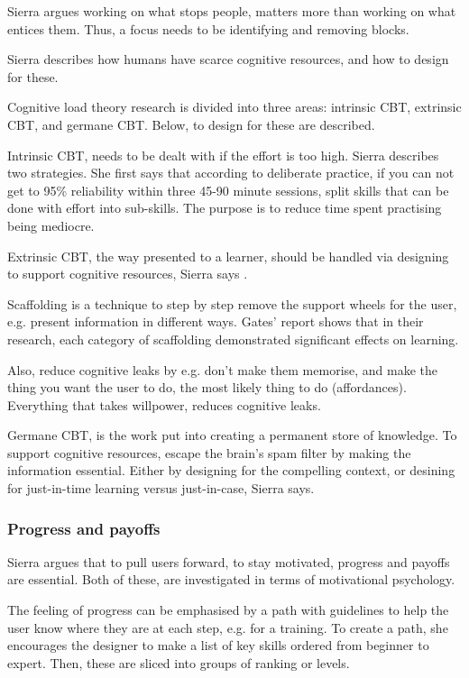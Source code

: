 Sierra argues working on what stops people, matters more than working on what entices them. Thus, a focus needs to be identifying and removing blocks.

Sierra \cite{sierra} describes how humans have scarce cognitive resources, and how to design for these.

Cognitive load theory research is divided into three areas: intrinsic CBT, extrinsic CBT, and germane CBT. Below, to design for these are described.

Intrinsic CBT, needs to be dealt with if the effort is too high. Sierra \cite{sierra}describes two strategies. She first says that according to deliberate practice, if you can not get to 95\% reliability within three 45-90 minute sessions, split skills that can be done with effort into sub-skills. The purpose is to reduce time spent practising being mediocre.

Extrinsic CBT, the way presented to a learner, should be handled via designing to support cognitive resources, Sierra says \cite{sierra}.

Scaffolding is a technique to step by step remove the support wheels for the user, e.g. present information in different ways. Gates' \cite{gates} report shows that in their research, each category of scaffolding demonstrated significant effects on learning.

Also, reduce cognitive leaks by e.g. don't make them memorise, and make the thing you want the user to do, the most likely thing to do (affordances). Everything that takes willpower, reduces cognitive leaks.

Germane CBT, is the work put into creating a permanent store of knowledge. To support cognitive resources, escape the brain's spam filter by making the information essential. Either by designing for the compelling context, or desining for just-in-time learning versus just-in-case, Sierra says. \cite{sierra}

\subsubsection{Progress and payoffs}

Sierra argues that to pull users forward, to stay motivated, progress and payoffs are essential. Both of these, are investigated in terms of motivational psychology.

The feeling of progress can be emphasised by a path with guidelines to help the user know where they are at each step, e.g. for a training. To create a path, she encourages the designer to make a list of key skills ordered from beginner to expert. Then, these are sliced into groups of ranking or levels.

